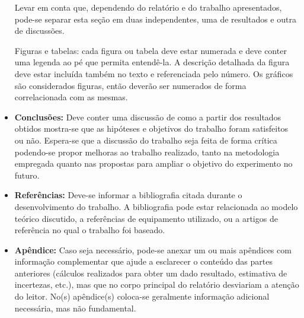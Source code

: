 \begin{itemize}
Levar em conta que, dependendo do relatório e do trabalho apresentados, pode-se separar esta seção em duas independentes, uma de resultados e outra de discussões. 

Figuras e tabelas: cada figura ou tabela deve estar numerada e deve conter uma legenda ao pé que permita entendê-la. A descrição detalhada da figura deve estar incluída também no texto e referenciada pelo número. Os gráficos são considerados figuras, então deverão ser numerados de forma correlacionada com as mesmas.

\item {\bf Conclusões:} 
Deve conter uma discussão de como a partir dos resultados obtidos mostra-se que as hipóteses e objetivos do trabalho foram satisfeitos ou não. Espera-se que a discussão do trabalho seja feita de forma crítica podendo-se propor melhoras ao trabalho realizado, tanto na metodologia empregada quanto nas propostas para ampliar o objetivo do experimento no futuro.

\item {\bf Referências:} 
Deve-se informar a bibliografia citada durante o desenvolvimento do trabalho. A bibliografia pode estar relacionada ao modelo teórico discutido, a referências de equipamento utilizado, ou a artigos de referência no qual o trabalho foi baseado.

\item {\bf Apêndice:} 
Caso seja necessário, pode-se anexar um ou mais apêndices com in\-for\-ma\-ção complementar que ajude a esclarecer o conteúdo das partes anteriores (cálculos realizados para obter um dado resultado, estimativa de incertezas, etc.), mas que no corpo principal do relatório desviariam a atenção do leitor. No(s) a\-pên\-di\-ce(s) coloca-se geralmente informação adicional necessária, mas não fundamental.

\end{itemize}